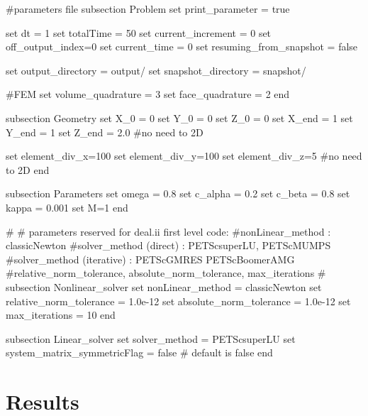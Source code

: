 \begin{DoxyCode}
\textcolor{preprocessor}{#parameters file}
\textcolor{preprocessor}{}
subsection Problem
set print\_parameter = \textcolor{keyword}{true}

set dt = 1
set totalTime = 50
set current\_increment = 0
set off\_output\_index=0
set current\_time = 0
set resuming\_from\_snapshot = \textcolor{keyword}{false}

set output\_directory = output/
set snapshot\_directory = snapshot/

\textcolor{preprocessor}{#FEM}
\textcolor{preprocessor}{}set volume\_quadrature = 3 
set face\_quadrature = 2 
end

subsection Geometry
set X\_0 = 0
set Y\_0 = 0
set Z\_0 = 0
set X\_end = 1 
set Y\_end = 1
set Z\_end = 2.0 #no need to 2D

set element\_div\_x=100
set element\_div\_y=100
set element\_div\_z=5 #no need to 2D
end

subsection Parameters
set omega = 0.8
set c\_alpha = 0.2
set c\_beta = 0.8
set kappa = 0.001
set M=1
end
                        
\textcolor{preprocessor}{#}
\textcolor{preprocessor}{}\textcolor{preprocessor}{# parameters reserved for deal.ii first level code:}
\textcolor{preprocessor}{}\textcolor{preprocessor}{#nonLinear\_method : classicNewton}
\textcolor{preprocessor}{}\textcolor{preprocessor}{#solver\_method (direct) : PETScsuperLU, PETScMUMPS}
\textcolor{preprocessor}{}\textcolor{preprocessor}{#solver\_method (iterative) : PETScGMRES PETScBoomerAMG}
\textcolor{preprocessor}{}\textcolor{preprocessor}{#relative\_norm\_tolerance, absolute\_norm\_tolerance, max\_iterations}
\textcolor{preprocessor}{}\textcolor{preprocessor}{#}
\textcolor{preprocessor}{}subsection Nonlinear\_solver
        set nonLinear\_method = classicNewton
        set relative\_norm\_tolerance = 1.0e-12
        set absolute\_norm\_tolerance = 1.0e-12
        set max\_iterations = 10
end
                        
subsection Linear\_solver
        set solver\_method = PETScsuperLU
        set system\_matrix\_symmetricFlag = \textcolor{keyword}{false} # \textcolor{keywordflow}{default} is \textcolor{keyword}{false}
end
\end{DoxyCode}
\hypertarget{growth_results}{}\section{Results}\label{growth_results}
  